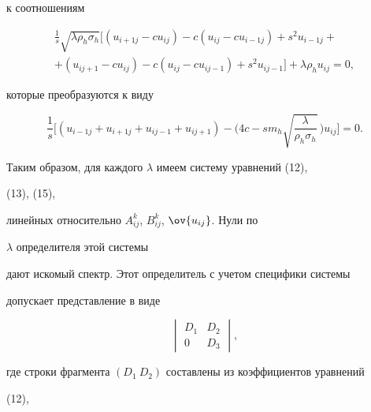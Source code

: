 к соотношениям 


\begin{multline*} 


\frac{1}{s}\sqrt{\lambda\rho_h\sigma_h} 


[(u_{i+1j}-c u_{ij})-c(u_{ij}-c u_{i-1j})+ 


s^2u_{i-1j}+ \\ 


% 


+(u_{ij+1}-c u_{ij})-c(u_{ij}-c u_{ij-1})+ 


s^2u_{ij-1}]+\lambda\rho_h u_{ij}=0, 


\end{multline*} 


которые преобразуются к виду 


\begin{equation} 


\frac{1}{s}\bigg[(u_{i-1j}+u_{i+1j}+ 


u_{ij-1}+u_{ij+1})-\bigg(4c-s m_h 


\sqrt{\frac{\lambda}{\rho_h\sigma_h}}\,\bigg)u_{ij} 


\bigg]=0. 


\end{equation} 


 


Таким образом, для каждого $\lambda$ имеем систему уравнений (12), 


(13), (15), 


линейных относительно $A^k_{ij}$, $B^k_{ij}$, $\ov{u_{ij}}$. Нули по 


$\lambda$ определителя этой системы 


дают искомый спектр. Этот определитель с учетом специфики системы 


допускает представление в виде 


\begin{equation} 


\begin{vmatrix} 


D_1 & D_2 \\ 0 & D_3 


\end{vmatrix} 


, 


\end{equation} 


где строки фрагмента $(D_1\ D_2)$ составлены из коэффициентов уравнений 


(12), 


